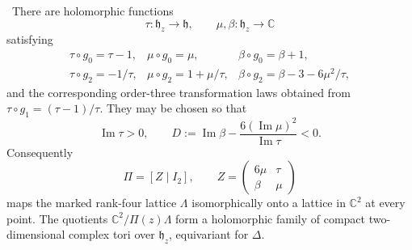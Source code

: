 \begin{proposition}
\label{prop:period-input-audit}
\Verified\ There are holomorphic functions
\[
 \tau:\mathfrak h_z\to\mathfrak h,
 \qquad \mu,\beta:\mathfrak h_z\to\mathbb C
\]
satisfying
\[
\begin{array}{lll}
\tau\circ g_0=\tau-1,&\mu\circ g_0=\mu,&\beta\circ g_0=\beta+1,\\
\tau\circ g_2=-1/\tau,&\mu\circ g_2=1+\mu/\tau,
 &\beta\circ g_2=\beta-3-6\mu^2/\tau,
\end{array}
\tag{2.1}
\]
and the corresponding order-three transformation laws obtained from
\(\tau\circ g_1=(\tau-1)/\tau\).  They may be chosen so that
\[
 \operatorname{Im}\tau>0,
 \qquad
 D:=\operatorname{Im}\beta-
 \frac{6(\operatorname{Im}\mu)^2}{\operatorname{Im}\tau}<0.
\tag{2.2}
\]
Consequently
\[
 \Pi=[Z\mid I_2],\qquad
 Z=\begin{pmatrix}6\mu&\tau\\ \beta&\mu\end{pmatrix}
\tag{2.3}
\]
maps the marked rank-four lattice \(\Lambda\) isomorphically onto a lattice
in \(\mathbb C^2\) at every point.  The quotients
\(\mathbb C^2/\Pi(z)\Lambda\) form a holomorphic family of compact
two-dimensional complex tori over \(\mathfrak h_z\), equivariant for
\(\Delta\).
\end{proposition}

